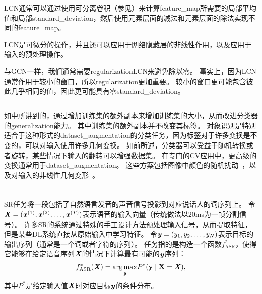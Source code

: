 \gls{LCN}通常可以通过使用可分离卷积（参见）来计算\gls{feature_map}所需要的局部平均值和局部\gls{standard_deviation}，然后使用元素层面的减法和元素层面的除法实现不同的\gls{feature_map}。

\gls{LCN}是可微分的操作，并且还可以应用于网络隐藏层的非线性作用，以及应用于输入的预处理操作。

与\gls{GCN}一样，我们通常需要\gls{regularization}\gls{LCN}来避免除以零。
事实上，因为\gls{LCN}通常作用于较小的窗口，所以\gls{regularization}更加重要。
较小的窗口更可能包含彼此几乎相同的值，因此更可能具有零\gls{standard_deviation}。


\subsection{}
\label{sec:dataset_augmentation_chap12}
如中所讲到的，通过增加训练集的额外副本来增加训练集的大小，从而改进分类器的\gls{generalization}能力。
其中训练集的额外副本并不改变其标签。
对象识别是特别适合于这种形式的\gls{dataset_augmentation}的分类任务，因为标签对于许多变换是不变的，可以对输入使用许多几何变换。
如前所述，分类器可以受益于随机转换或者旋转，某些情况下输入的翻转可以增强数据集。
在专门的\gls{CV}应用中，更高级的变换通常用于\gls{dataset_augmentation}。
这些方案包括图像中颜色的随机扰动~\citep{Krizhevsky-2012}，以及对输入的非线性几何变形~\citep{chapter-gradient-document-2001}。




\section{}
\label{sec:speech_recognition}

\gls{SR}任务将一段包括了自然语言发音的声音信号投影到对应说话人的词序列上。
令$\boldsymbol{\mathit{X}}=(\boldsymbol{\mathit{x}}^{(1)},\boldsymbol{\mathit{x}}^{(2)},\ldots,\boldsymbol{\mathit{x}}^{(T)})$表示语音的输入向量（传统做法以$20$ms为一帧分割信号）。
许多\gls{SR}的系统通过特殊的手工设计方法预处理输入信号，从而提取特征，但是某些\gls{DL}系统\citep{jaitly2011learning}直接从原始输入中学习特征。
令$\boldsymbol{\mathit{y}}=(y_{1},y_{2},\ldots,y_{N})$表示目标的输出序列（通常是一个词或者字符的序列）。
任务指的是构造一个函数$f^*_{\text{ASR}}$，使得它能够在给定语音序列$\boldsymbol{\mathit{X}}$的情况下计算最有可能的$\boldsymbol{\mathit{y}}$序列：
\begin{align}
\label{eqn:124}
f^*_{\text{ASR}}(\boldsymbol{\mathit{X}}) =  \underset{\boldsymbol{\mathit{y}}}{\arg\max}  P^*(\mathbf{y} \mid \boldsymbol{\mathrm{X}} = \boldsymbol{\mathit{X}}),
\end{align}
其中$P^*$是给定输入值$\boldsymbol{\mathit{X}}$时对应目标$\boldsymbol{\mathit{y}}$的条件分布。

